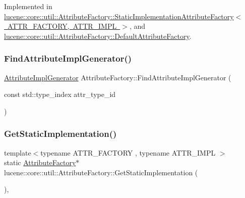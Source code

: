 Implemented in \mbox{\hyperlink{classlucene_1_1core_1_1util_1_1AttributeFactory_1_1StaticImplementationAttributeFactory_a06466469f2cf37e0ef599e617d415c6a}{lucene\+::core\+::util\+::\+Attribute\+Factory\+::\+Static\+Implementation\+Attribute\+Factory$<$ A\+T\+T\+R\+\_\+\+F\+A\+C\+T\+O\+R\+Y, A\+T\+T\+R\+\_\+\+I\+M\+P\+L $>$}}, and \mbox{\hyperlink{classlucene_1_1core_1_1util_1_1AttributeFactory_1_1DefaultAttributeFactory_af9b68def67fc7995d2c5e9f3d1560f5e}{lucene\+::core\+::util\+::\+Attribute\+Factory\+::\+Default\+Attribute\+Factory}}.

\mbox{\label{classlucene_1_1core_1_1util_1_1AttributeFactory_af56838e41c83a10b00063e02c3f910e6}} 
\subsubsection{\texorpdfstring{Find\+Attribute\+Impl\+Generator()}{FindAttributeImplGenerator()}}
{\footnotesize\ttfamily \mbox{\hyperlink{namespacelucene_1_1core_1_1util_acbd8821be7d7b29749374e57b0a7c40b}{Attribute\+Impl\+Generator}} Attribute\+Factory\+::\+Find\+Attribute\+Impl\+Generator (\begin{DoxyParamCaption}\item[{const std\+::type\+\_\+index}]{attr\+\_\+type\+\_\+id }\end{DoxyParamCaption})\hspace{0.3cm}{\ttfamily [static]}}

\mbox{\label{classlucene_1_1core_1_1util_1_1AttributeFactory_ac770bcd808b70e6d1d5f8a3c6cd8150d}} 
\subsubsection{\texorpdfstring{Get\+Static\+Implementation()}{GetStaticImplementation()}}
{\footnotesize\ttfamily template$<$typename A\+T\+T\+R\+\_\+\+F\+A\+C\+T\+O\+RY , typename A\+T\+T\+R\+\_\+\+I\+M\+PL $>$ \\
static \mbox{\hyperlink{classlucene_1_1core_1_1util_1_1AttributeFactory}{Attribute\+Factory}}$\ast$ lucene\+::core\+::util\+::\+Attribute\+Factory\+::\+Get\+Static\+Implementation (\begin{DoxyParamCaption}{ }\end{DoxyParamCaption})\hspace{0.3cm}{\ttfamily [inline]}, {\ttfamily [static]}}

